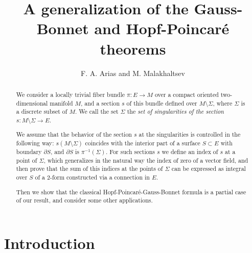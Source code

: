 \documentclass[12pt,letterpaper]{amsart}
\author{F. A. Arias and M. Malakhaltsev}
\title{A generalization of the Gauss-Bonnet and Hopf-Poincaré theorems}
\theoremstyle{definition}
\theoremstyle{plain}
\theoremstyle{remark}
\begin{document}
\maketitle

\begin{abstract}
We consider a locally trivial fiber bundle $\pi : E \to M$ over a compact oriented two-dimensional manifold $M$, and a section $s$ of this bundle defined over $M \setminus \Sigma$, where $\Sigma$ is a discrete subset of $M$.
We call the set $\Sigma$ the \emph{set of singularities of the section} $s : M \setminus \Sigma \to E$.

We assume that the behavior of the section $s$ at the singularities is controlled in the following way:
$s(M \setminus \Sigma)$ coincides with the interior part of a surface $S \subset E$ with boundary $\partial S$, and $\partial S$ is $\pi^{-1}(\Sigma)$. 
For such sections $s$ we define an index of $s$ at a point of $\Sigma$, which generalizes in the natural way the index of zero of a vector field, and then prove that the sum of this indices at the points of $\Sigma$ can be expressed as integral over $S$ of a $2$-form constructed via a connection in $E$.

Then we show that the classical Hopf-Poincaré-Gauss-Bonnet formula is a partial case of our result, and consider some other applications.
\end{abstract}



\section{Introduction}
\label{sec:1}
\end{document}
